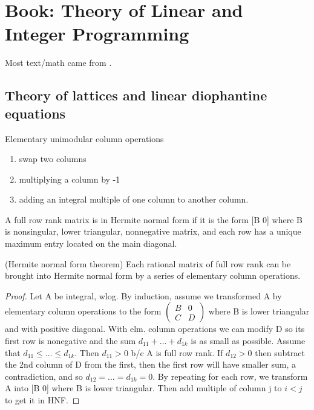  \chapter{Book: Theory of Linear and Integer Programming}

Most text/math came from \cite{schrijver}.


\section{Theory of lattices and linear diophantine equations}



\begin{definition}
Elementary unimodular column operations
\begin{enumerate}
	\item swap two columns
	\item multiplying a column by -1
	\item adding an integral multiple of one column to another column.
\end{enumerate}
\end{definition}


\begin{definition}
A full row rank matrix is in Hermite normal form if it is the form [B 0] where B is nonsingular, lower triangular, nonnegative matrix, and each row has a unique maximum entry located on the main diagonal. 
\end{definition}


\begin{theorem}(Hermite normal form theorem)
Each rational matrix of full row rank can be brought into Hermite normal form by a series of elementary column operations.
\end{theorem}
\begin{proof}
Let A be integral, wlog. By induction, assume we transformed A by elementary column operations to the form 
$\left(\begin{matrix} B & 0 \\ C & D \end{matrix}\right)$ where B is lower triangular and with positive diagonal. With elm. column operations we can modify D so its first row is nonegative and the sum $d_{11} + \dots + d_{1k}$ is as small as possible. Assume that $d_{11} \leq \dots \leq d_{1k}$. Then $d_{11} >0$ b/c A is full row rank. If $d_{12} > 0$ then subtract the 2nd column of D from the first, then the first row will have smaller sum, a contradiction, and so $d_{12} = \dots = d_{1k} = 0$. By repeating for each row, we transform A into [B 0] where B is lower triangular. Then add multiple of column j to $i < j$ to get it in HNF.
\end{proof}


